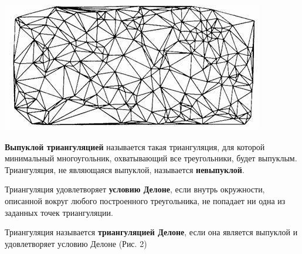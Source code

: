 \documentclass[a4paper, 12pt]{article}   	%
\begin{document}
    \begin{center}
        \begin{minipage}{0.7\linewidth}
            \includegraphics[width=\linewidth]{img/triangulation}
        \end{minipage}
    \end{center}
    
    \textbf{Выпуклой триангуляцией} называется такая триангуляция, для которой минимальный многоугольник, охватывающий все треугольники, будет выпуклым. Триангуляция, не являющаяся выпуклой, называется \textbf{невыпуклой}. \cite{scvortsov}
    
    Триангуляция удовлетворяет \textbf{условию Делоне}, если внутрь окружности, описанной вокруг любого построенного треугольника, не попадает ни одна из заданных точек триангуляции. \cite{scvortsov}
    
    Триангуляция называется \textbf{триангуляцией Делоне}, если она является выпуклой и удовлетворяет условию Делоне (Рис. 2)
    
\end{document}
